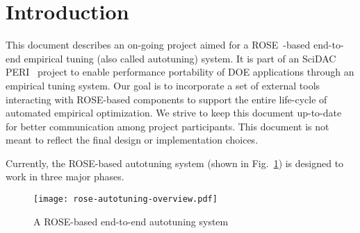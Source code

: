\section{Introduction}
This document describes an on-going project aimed for a
ROSE~\cite{roseWeb2008}-based end-to-end empirical tuning (also called
    autotuning) system. 
It is part of an SciDAC PERI~\cite{peri} project to enable performance
portability of DOE applications through an empirical tuning system.
Our goal is to incorporate a set of external tools interacting with
ROSE-based components to support the entire life-cycle of automated empirical optimization.
We strive to keep this document up-to-date for better communication among
project participants. 
This document is not meant to reflect the final design or implementation choices. 

%

Currently, the ROSE-based autotuning system (shown in
    Fig.~\ref{fig:autotuning-overview}) is designed to work in three major
phases. 

\begin{figure}[htbp]  
                \vspace{-15ex}
	\centering
		\texttt{[image: rose-autotuning-overview.pdf]}
                \vspace{-15ex}
	\caption{A ROSE-based end-to-end autotuning system}
	\label{fig:autotuning-overview}
\end{figure}


